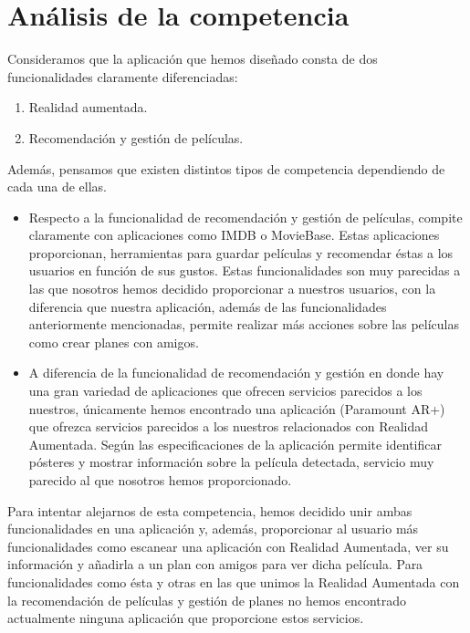 \section{Análisis de la competencia}
\label{makereference3.1}
    Consideramos que la aplicación que hemos diseñado consta de dos funcionalidades claramente diferenciadas:
    \begin{enumerate}
    \item Realidad aumentada.
    \item Recomendación y gestión de películas.
    \end{enumerate}
    Además, pensamos que existen distintos tipos de competencia dependiendo de cada una de ellas.
     \begin{itemize}  
         \item Respecto a la funcionalidad de recomendación y gestión de películas, compite claramente con aplicaciones como IMDB\cite{imdb} o MovieBase\cite{moviebase}. 
         Estas aplicaciones proporcionan, herramientas para guardar películas y recomendar éstas a los usuarios en función de sus gustos. Estas funcionalidades son 
         muy parecidas a las que nosotros hemos decidido proporcionar a nuestros usuarios, con la diferencia que nuestra aplicación, además de las funcionalidades anteriormente 
         mencionadas, permite realizar más acciones sobre las películas como crear planes con amigos.
        \item A diferencia de la funcionalidad de recomendación y gestión en donde hay una gran variedad de aplicaciones que ofrecen servicios parecidos a los nuestros, únicamente hemos 
        encontrado una aplicación (Paramount AR+\cite{paramountar}) que ofrezca servicios parecidos a los nuestros relacionados con Realidad Aumentada. Según las especificaciones de la aplicación permite identificar pósteres y 
        mostrar información sobre la película detectada, servicio muy parecido al que nosotros hemos proporcionado. 
    \end{itemize}
    
Para intentar alejarnos de esta competencia, hemos decidido unir ambas funcionalidades en una aplicación y, además, proporcionar al usuario más funcionalidades como escanear una aplicación con Realidad Aumentada, 
 ver su información y añadirla a un plan con amigos para ver dicha película. Para funcionalidades como ésta y otras en las que unimos la Realidad Aumentada con la recomendación de películas y gestión de planes no hemos encontrado 
 actualmente ninguna aplicación que proporcione estos servicios.

